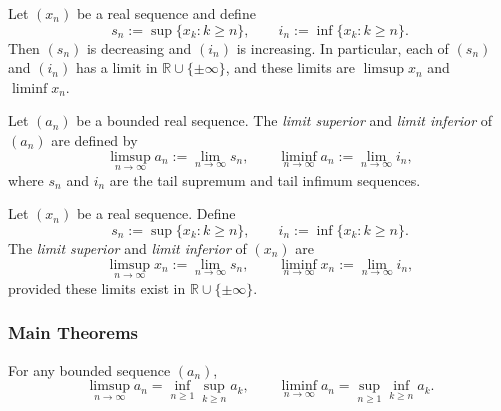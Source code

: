 \begin{theorem}
Let $(x_n)$ be a real sequence and define
\[
s_n := \sup\{x_k : k\ge n\},
\qquad
i_n := \inf\{x_k : k\ge n\}.
\]
Then $(s_n)$ is decreasing and $(i_n)$ is increasing. In particular, each of $(s_n)$ and $(i_n)$
has a limit in $\mathbb{R}\cup\{\pm\infty\}$, and these limits are $\limsup x_n$ and $\liminf x_n$.
\end{theorem}



\begin{tcolorbox}[colback=propbox, colframe=propborder, arc=2pt,
  left=6pt, right=6pt, top=4pt, bottom=4pt,
  title={\small\textbf{Definition (Limit superior and limit inferior)}},
  fonttitle=\small\bfseries]
Let $(a_n)$ be a bounded real sequence. The \emph{limit superior} and 
\emph{limit inferior} of $(a_n)$ are defined by
\[
\limsup_{n\to\infty} a_n := \lim_{n\to\infty} s_n,
\qquad
\liminf_{n\to\infty} a_n := \lim_{n\to\infty} i_n,
\]
where $s_n$ and $i_n$ are the tail supremum and tail infimum sequences.
\end{tcolorbox}

\begin{tcolorbox}[colback=propbox, colframe=propborder, arc=2pt,
  left=6pt, right=6pt, top=4pt, bottom=4pt,
  title={\small\textbf{Definition (Limit superior and limit inferior)}},
  fonttitle=\small\bfseries]
Let $(x_n)$ be a real sequence. Define
\[
s_n := \sup\{x_k : k\ge n\},
\qquad
i_n := \inf\{x_k : k\ge n\}.
\]
The \emph{limit superior} and \emph{limit inferior} of $(x_n)$ are
\[
\limsup_{n\to\infty} x_n := \lim_{n\to\infty} s_n,
\qquad
\liminf_{n\to\infty} x_n := \lim_{n\to\infty} i_n,
\]
provided these limits exist in $\mathbb{R}\cup\{\pm\infty\}$.
\end{tcolorbox}

\subsubsection{Main Theorems}

\begin{theorem}
For any bounded sequence $(a_n)$,
\[
\limsup_{n\to\infty} a_n = \inf_{n \ge 1} \sup_{k \ge n} a_k,
\qquad
\liminf_{n\to\infty} a_n = \sup_{n \ge 1} \inf_{k \ge n} a_k.
\]
\end{theorem}



